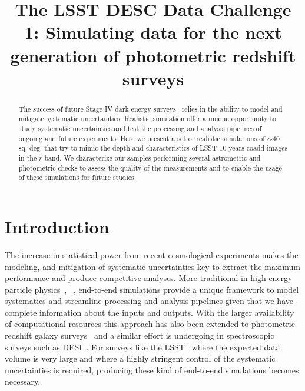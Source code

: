 \documentclass[\docopts]{\docclass}
\begin{document}
\title{ The LSST DESC Data Challenge 1: Simulating data for the next generation of photometric redshift surveys }

\maketitlepre

\begin{abstract}

The success of future Stage IV dark energy surveys~\citep{2006astro.ph..9591A} relies in the ability to model and mitigate systematic uncertainties.
Realistic simulation offer a unique opportunity to study systematic uncertainties and test the processing and analysis pipelines
of ongoing and future experiments. Here we present a set of realistic simulations of $\sim 40$ sq.-deg. that try to mimic the depth
and characteristics of LSST 10-years coadd images in the $r$-band. We characterize our samples performing several astrometric and
photometric checks to assess the quality of the measurements and to enable the usage of these simulations for future studies. 

\end{abstract}


\maketitlepost

% 

\section{Introduction}
\label{sec:intro}

The increase in statistical power from recent cosmological experiments makes the modeling, and mitigation of systematic uncertainties
key to extract the maximum performance and produce competitive analyses. More traditional in high energy particle physics~\citep{Brun:118715},
~\citep{2006JHEP...05..026S}, end-to-end simulations provide a unique framework to model systematics and streamline processing and analysis
pipelines given that we have complete information about the inputs and outputs. With the larger availability of computational resources this
approach has also been extended to photometric redshift galaxy surveys~\citep{2016MNRAS.457..786S,2016ApJ...817...25B} and a similar effort is undergoing in spectroscopic surveys such as DESI~\citep{2016arXiv161100036D}. For surveys like the LSST~\citep{2008arXiv0805.2366I} where the expected data volume is very large and where a highly stringent control of the systematic uncertainties is required, producing these kind of end-to-end simulations becomes necessary.
\end{document}
